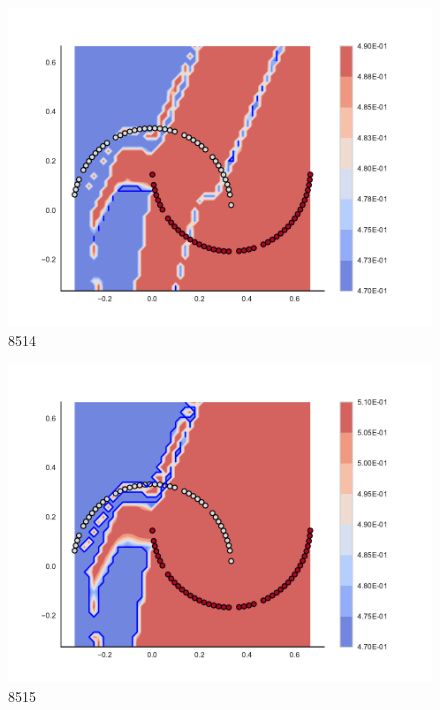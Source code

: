 \begin{subfigure}[b]{0.09\textwidth}
    \includegraphics[clip, trim=2.35cm 1.75cm 4.5cm 0cm,width=\textwidth]{img/convergence/8514.pdf}
    \caption{8514}
    \label{fig:convergence_8514}
\end{subfigure}
%
\begin{subfigure}[b]{0.09\textwidth}
    \includegraphics[clip, trim=2.35cm 1.75cm 4.5cm 0cm,width=\textwidth]{img/convergence/8515.pdf}
    \caption{8515}
    \label{fig:convergence_8515}
\end{subfigure}
%
